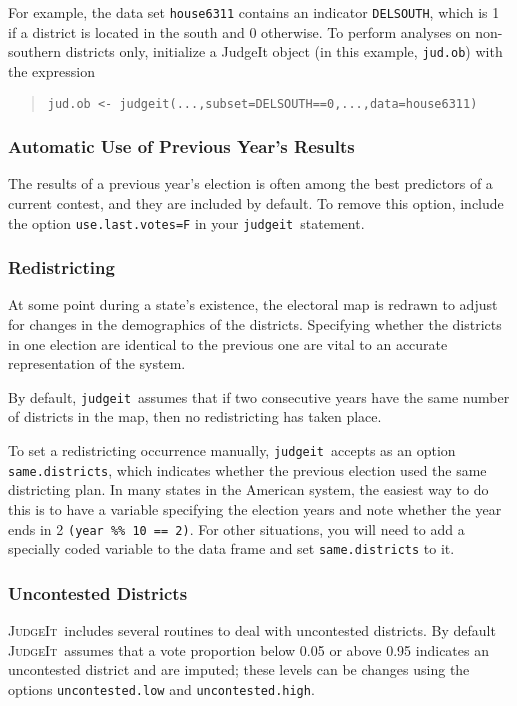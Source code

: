 \documentclass[oneside,letterpaper,titlepage]{article}
\newcommand{\JudgeIt}{\textsc{JudgeIt}\ }
\newcommand{\jud}{\texttt{judgeit}\ }
\begin{document}
For example, the data set \texttt{house6311} contains an indicator
\texttt{DELSOUTH}, which is 1 if a district is located in the south
and 0 otherwise.  To perform analyses on non-southern districts only,
initialize a JudgeIt object (in this example, \texttt{jud.ob}) with the expression

\begin{quote}
\texttt{jud.ob <- judgeit(...,subset=DELSOUTH==0,...,data=house6311)}
\end{quote}

\subsubsection{Automatic Use of Previous Year's Results}

The results of a previous year's election is often among the best
predictors of a current contest, and they are included by default. To
remove this option, include the option \texttt{use.last.votes=F} in
your \jud statement.

\subsubsection{Redistricting}

At some point during a state's existence, the electoral map is redrawn
to adjust for changes in the demographics of the districts.
Specifying whether the districts in one election are identical to the
previous one are vital to an accurate representation of the system.

By default, \jud assumes that if two consecutive years have the same number of districts in the map, then no redistricting has taken place.

To set a redistricting occurrence manually, \jud accepts
as an option \texttt{same.districts}, which indicates whether the
previous election used the same districting plan. In many states in
the American system, the easiest way to do this is to have a variable
specifying the election years and note whether the year ends in 2
\texttt{(year \%\% 10 == 2)}.  For other situations, you will need to
add a specially coded variable to the data frame and set
\texttt{same.districts} to it.

\subsubsection{Uncontested Districts}

\JudgeIt includes several routines to deal with uncontested districts.
By default \JudgeIt assumes that a vote proportion below 0.05 or above 0.95
indicates an uncontested district and are imputed; these levels can be
changes using the options \texttt{uncontested.low} and
\texttt{uncontested.high}.
\end{document}
